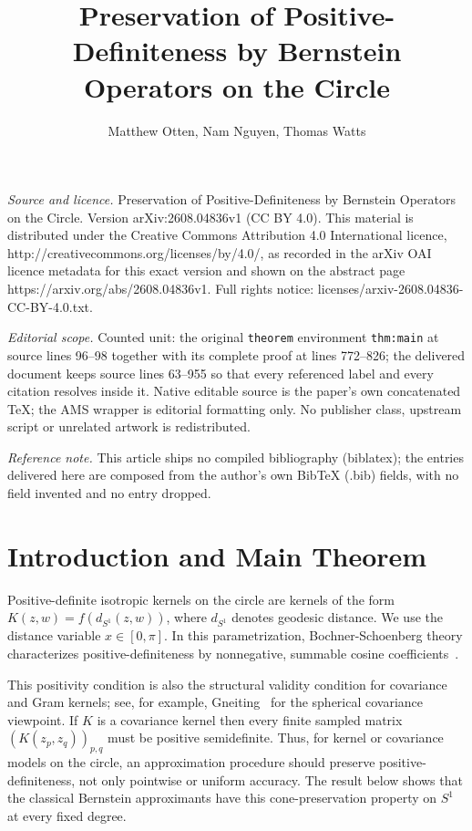 \documentclass[10pt,a4paper]{amsart}
\begin{document}
\title[Preservation of Positive-Definiteness by Bernstein Operators]{Preservation of Positive-Definiteness by Bernstein Operators on the Circle}
\author{Matthew Otten, Nam Nguyen, Thomas Watts}
\date{}
\maketitle
\noindent\emph{Source and licence.} Preservation of Positive-Definiteness by Bernstein Operators on the Circle. Version arXiv:2608.04836v1 (CC BY 4.0). This material is distributed under the Creative Commons Attribution 4.0 International licence, http://creativecommons.org/licenses/by/4.0/, as recorded in the arXiv OAI licence metadata for this exact version and shown on the abstract page https://arxiv.org/abs/2608.04836v1. Full rights notice: licenses/arxiv-2608.04836-CC-BY-4.0.txt.\par\smallskip
\noindent\textit{Editorial scope.} Counted unit: the original \texttt{theorem} environment \texttt{thm:main} at source lines 96--98 together with its complete proof at lines 772--826; the delivered document keeps source lines 63--955 so that every referenced label and every citation resolves inside it. Native editable source is the paper's own concatenated TeX; the AMS wrapper is editorial formatting only. No publisher class, upstream script or unrelated artwork is redistributed.
\par\smallskip\noindent\textit{Reference note.} This article ships no compiled bibliography (biblatex); the entries delivered here are composed from the author's own BibTeX (.bib) fields, with no field invented and no entry dropped.
\section{Introduction and Main Theorem}
Positive-definite isotropic kernels on the circle are kernels of the form $K(z,w)=f(d_{S^1}(z,w))$, where $d_{S^1}$ denotes geodesic distance. We use the distance variable $x\in[0,\pi]$. In this parametrization, Bochner-Schoenberg theory characterizes positive-definiteness by nonnegative, summable cosine coefficients~\cite{Schoenberg1942PositiveDF,Bingham1973PositiveDF,Katznelson2004Harmonic}.

This positivity condition is also the structural validity condition for covariance and Gram kernels; see, for example, Gneiting~\cite{Gneiting2013Spheres} for the spherical covariance viewpoint. If $K$ is a covariance kernel then every finite sampled matrix $(K(z_p,z_q))_{p,q}$ must be positive semidefinite. Thus, for kernel or covariance models on the circle, an approximation procedure should preserve positive-definiteness, not only pointwise or uniform accuracy. The result below shows that the classical Bernstein approximants have this cone-preservation property on $S^1$ at every fixed degree.
\end{document}
